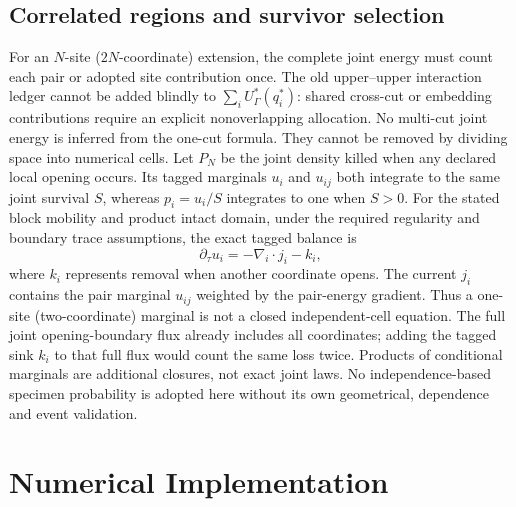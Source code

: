 \documentclass[11pt]{article}
\begin{document}
\subsection{Correlated regions and survivor selection}
For an $N$-site ($2N$-coordinate) extension, the complete joint energy must
count each pair or adopted site contribution once. The old upper--upper
interaction ledger cannot be added blindly to $\sum_iU_\Gamma^*(q_i^*)$: 
shared cross-cut or embedding contributions require an explicit nonoverlapping
allocation. No multi-cut joint energy is inferred from the one-cut formula.
They cannot be removed by dividing space into numerical cells.
Let $P_N$ be the joint density killed when any declared local opening occurs.
Its tagged marginals $u_i$ and $u_{ij}$ both integrate to the same joint survival
$S$, whereas $p_i=u_i/S$ integrates to one when $S>0$.
For the stated block mobility and product intact domain, under the required
regularity and boundary trace assumptions, the exact tagged balance is
\begin{equation}
 \partial_\tau u_i=-\nabla_i\!\cdot j_i-k_i,
\end{equation}
where $k_i$ represents removal when another coordinate opens. The current $j_i$
contains the pair marginal $u_{ij}$ weighted by the pair-energy gradient.
Thus a one-site (two-coordinate) marginal is not a closed independent-cell equation.
The full joint opening-boundary flux already includes all coordinates;
adding the tagged sink $k_i$ to that full flux would count the same loss twice.
Products of conditional marginals are additional closures, not exact joint laws.
No independence-based specimen probability is adopted here without its own
geometrical, dependence and event validation.

\section{Numerical Implementation}
\end{document}
